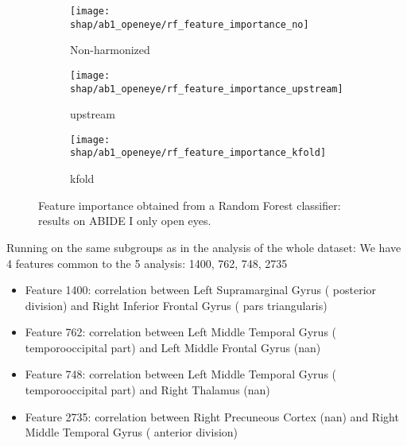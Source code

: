 \documentclass[10pt]{report}
\begin{document}
\begin{figure}
\centering
\begin{subfigure}[b]{.45\textwidth}
   \texttt{[image: shap/ab1\_openeye/rf\_feature\_importance\_no]}
   \caption{Non-harmonized}
   \label{}
\end{subfigure}
\begin{subfigure}[b]{.45\textwidth}
   \texttt{[image: shap/ab1\_openeye/rf\_feature\_importance\_upstream]}
   \caption{upstream}
   \label{}
\end{subfigure}
\begin{subfigure}[b]{.45\textwidth}
   \texttt{[image: shap/ab1\_openeye/rf\_feature\_importance\_kfold]}
   \caption{kfold}
   \label{}
\end{subfigure}
\caption{Feature importance obtained from a Random Forest classifier: results on ABIDE I only open eyes.}
\label{fig:rf_feature_importance_ab1}
\end{figure}




Running on the same subgroups as in the analysis of the whole dataset:
We have 4 features common to the 5 analysis: 1400, 762, 748, 2735
\begin{itemize}
\item Feature 1400: correlation between Left Supramarginal Gyrus ( posterior division) and Right Inferior Frontal Gyrus ( pars triangularis)
\item Feature 762: correlation between Left Middle Temporal Gyrus ( temporooccipital part) and Left Middle Frontal Gyrus (nan)
\item Feature 748: correlation between Left Middle Temporal Gyrus ( temporooccipital part) and Right Thalamus (nan)
\item Feature 2735: correlation between Right Precuneous Cortex (nan) and Right Middle Temporal Gyrus ( anterior division)
\end{itemize}
\end{document}
